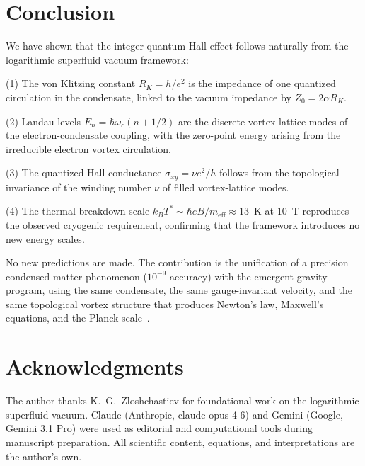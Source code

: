 \documentclass[12pt, a4paper]{article}
\newcommand{\meff}{m_{\mathrm{eff}}}
\begin{document}
\section{Conclusion}
\label{sec:conclusion}

We have shown that the integer quantum Hall effect
follows naturally from the logarithmic superfluid
vacuum framework:

(1) The von Klitzing constant $R_K = h/e^2$ is the
impedance of one quantized circulation in the
condensate, linked to the vacuum impedance by
$Z_0 = 2\alpha R_K$.

(2) Landau levels $E_n = \hbar\omega_c(n + 1/2)$
are the discrete vortex-lattice modes of the
electron-condensate coupling, with the zero-point
energy arising from the irreducible electron vortex
circulation.

(3) The quantized Hall conductance
$\sigma_{xy} = \nu e^2/h$ follows from the
topological invariance of the winding number $\nu$
of filled vortex-lattice modes.

(4) The thermal breakdown scale
$k_B T^* \sim \hbar eB/\meff \approx 13$~K at
10~T reproduces the observed cryogenic requirement,
confirming that the framework introduces no new
energy scales.

No new predictions are made. The contribution is the
unification of a precision condensed matter
phenomenon ($10^{-9}$ accuracy) with the emergent
gravity program, using the same condensate, the same
gauge-invariant velocity, and the same topological
vortex structure that produces Newton's law, Maxwell's
equations, and the Planck
scale~\cite{kulangiev_gravity,kulangiev_geff,
kulangiev_maxwell,kulangiev_planck}.


\section*{Acknowledgments}

The author thanks K.~G.~Zloshchastiev for
foundational work on the logarithmic superfluid
vacuum. Claude (Anthropic, claude-opus-4-6) and Gemini (Google, Gemini 3.1 Pro) were used as editorial and computational tools during manuscript preparation. All scientific content, equations, and
interpretations are the author's own.
\end{document}

